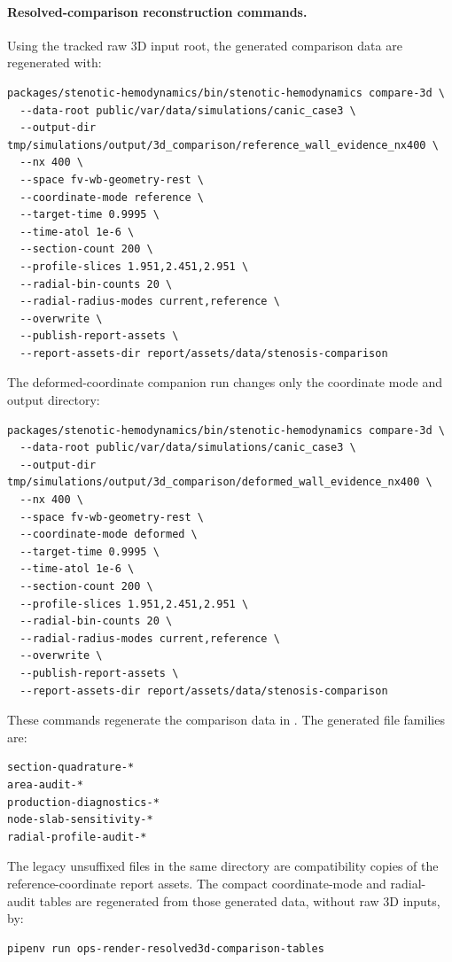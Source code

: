 \paragraph*{Resolved-comparison reconstruction commands.}
Using the tracked raw 3D input root, the generated comparison data are
regenerated with:
\begin{lstlisting}[basicstyle=\ttfamily\footnotesize,breaklines=true]
packages/stenotic-hemodynamics/bin/stenotic-hemodynamics compare-3d \
  --data-root public/var/data/simulations/canic_case3 \
  --output-dir tmp/simulations/output/3d_comparison/reference_wall_evidence_nx400 \
  --nx 400 \
  --space fv-wb-geometry-rest \
  --coordinate-mode reference \
  --target-time 0.9995 \
  --time-atol 1e-6 \
  --section-count 200 \
  --profile-slices 1.951,2.451,2.951 \
  --radial-bin-counts 20 \
  --radial-radius-modes current,reference \
  --overwrite \
  --publish-report-assets \
  --report-assets-dir report/assets/data/stenosis-comparison
\end{lstlisting}
The deformed-coordinate companion run changes only the coordinate mode and
output directory:
\begin{lstlisting}[basicstyle=\ttfamily\footnotesize,breaklines=true]
packages/stenotic-hemodynamics/bin/stenotic-hemodynamics compare-3d \
  --data-root public/var/data/simulations/canic_case3 \
  --output-dir tmp/simulations/output/3d_comparison/deformed_wall_evidence_nx400 \
  --nx 400 \
  --space fv-wb-geometry-rest \
  --coordinate-mode deformed \
  --target-time 0.9995 \
  --time-atol 1e-6 \
  --section-count 200 \
  --profile-slices 1.951,2.451,2.951 \
  --radial-bin-counts 20 \
  --radial-radius-modes current,reference \
  --overwrite \
  --publish-report-assets \
  --report-assets-dir report/assets/data/stenosis-comparison
\end{lstlisting}
These commands regenerate the comparison data in
.  The generated file families are:
\begin{lstlisting}[basicstyle=\ttfamily\footnotesize,breaklines=true]
section-quadrature-*
area-audit-*
production-diagnostics-*
node-slab-sensitivity-*
radial-profile-audit-*
\end{lstlisting}
The legacy unsuffixed files in the same directory are compatibility copies of
the reference-coordinate report assets. The compact coordinate-mode and
radial-audit tables are regenerated from those generated data, without raw 3D
inputs, by:
\begin{lstlisting}[basicstyle=\ttfamily\footnotesize,breaklines=true]
pipenv run ops-render-resolved3d-comparison-tables
\end{lstlisting}

